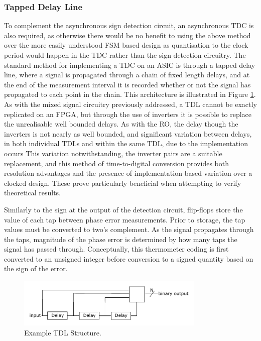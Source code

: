 \subsubsection{Tapped Delay Line}
To complement the asynchronous sign detection circuit, an asynchronous \ac{TDC} is also required, as otherwise there would be no benefit to using the above method over the more easily understood \ac{FSM} based design as quantisation to the clock period would happen in the \ac{TDC} rather than the sign detection circuitry. The standard method for implementing a \ac{TDC} on an \ac{ASIC} is through a tapped delay line, where a signal is propagated through a chain of fixed length delays, and at the end of the measurement interval it is recorded whether or not the signal has propagated to each point in the chain. This architecture is illustrated in Figure \ref{fig:simple_tdc}. As with the mixed signal circuitry previously addressed, a \ac{TDL} cannot be exactly replicated on an \ac{FPGA}, but through the use of inverters it is possible to replace the unrealisable well bounded delays. As with the \ac{RO}, the delay though the inverters is not nearly as well bounded, and significant variation between delays, in both individual \ac{TDL}s and within the same \ac{TDL}, due to the implementation occurs This variation notwithstanding, the inverter pairs are a suitable replacement, and this method of time-to-digital conversion provides both resolution advantages and the presence of implementation based variation over a clocked design. These prove particularly beneficial when attempting to verify theoretical results.

Similarly to the sign at the output of the detection circuit, flip-flops store the value of each tap between phase error measurements. Prior to storage, the tap values must be converted to two's complement. As the signal propagates through the taps, magnitude of the phase error is determined by how many taps the signal has passed through. Conceptually, this thermometer coding is first converted to an unsigned integer before conversion to a signed quantity based on the sign of the error.
\begin{figure}[h]
	\centering
	\includegraphics[width=0.8\textwidth]{../simple_tdc}
	\caption[Example \acl{TDL} Structure]{Example \acl{TDL} Structure.}
	\label{fig:simple_tdc}
\end{figure}

